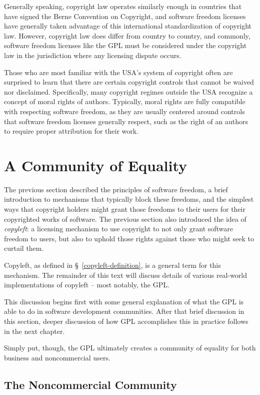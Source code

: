 Generally speaking, copyright law operates similarly enough in countries that
have signed the Berne Convention on Copyright, and software freedom licenses
have generally taken advantage of this international standardization of
copyright law.  However, copyright law does differ from country to country,
and commonly, software freedom licenses like the GPL must be considered under the
copyright law in the jurisdiction where any licensing dispute occurs.

Those who are most familiar with the USA's system of copyright often are
surprised to learn that there are certain copyright controls that cannot be
waived nor disclaimed.  Specifically, many copyright regimes outside the USA
recognize a concept of moral rights of authors.  Typically, moral rights are
fully compatible with respecting software freedom, as they are usually
centered around controls that software freedom licenses generally respect,
such as the right of an authors to require proper attribution for their work.

\section{A Community of Equality}

The previous section described the principles of software freedom, a brief
introduction to mechanisms that typically block these freedoms, and the
simplest ways that copyright holders might grant those freedoms to their
users for their copyrighted works of software.  The previous section also
introduced the idea of \textit{copyleft}: a licensing mechanism to use
copyright to not only grant software freedom to users, but also to uphold
those rights against those who might seek to curtail them.

Copyleft, as defined in \S~\ref{copyleft-definition}, is a general term for this
mechanism.  The remainder of this text will discuss details of various
real-world implementations of copyleft -- most notably, the GPL\@.

This discussion begins first with some general explanation of what the GPL is
able to do in software development communities.  After that brief discussion
in this section, deeper discussion of how GPL accomplishes this in practice
follows in the next chapter.

Simply put, though, the GPL ultimately creates a community of equality for
both business and noncommercial users.

\subsection{The Noncommercial Community}

